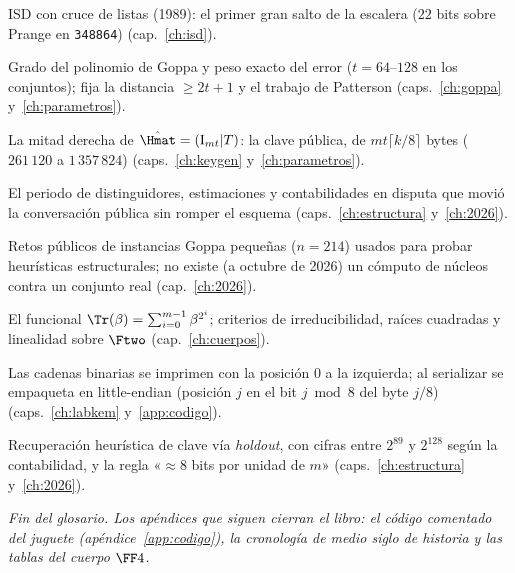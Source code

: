 \begin{description}[leftmargin=2.6em,style=nextline,itemsep=2.5pt,parsep=0pt]
  \item[\textbf{Stern (algoritmo de)}]
        ISD con cruce de listas (1989): el primer gran salto de la
        escalera ($22$ bits sobre Prange en \texttt{348864})
        (cap.~\ref{ch:isd}).

  \item[\textbf{$t$}]
        Grado del polinomio de Goppa y peso exacto del error
        ($t=64$--$128$ en los conjuntos); fija la distancia
        $\ge2t+1$ y el trabajo de Patterson
        (caps.~\ref{ch:goppa} y~\ref{ch:parametros}).

  \item[\textbf{$\Tmat$ (clave pública)}]
        La mitad derecha de $\hat{\Hmat}=(\mathrm{I}_{mt}|T)$: la
        clave pública, de $mt\lceil k/8\rceil$ bytes
        ($261\,120$ a $1\,357\,824$) (caps.~\ref{ch:keygen}
        y~\ref{ch:parametros}).

  \item[\textbf{Terremoto (2025--2026)}]
        El periodo de distinguidores, estimaciones y contabilidades
        en disputa que movió la conversación pública sin romper el
        esquema (caps.~\ref{ch:estructura} y~\ref{ch:2026}).

  \item[\textbf{TII}]
        Retos públicos de instancias Goppa pequeñas ($n=214$)
        usados para probar heurísticas estructurales; no existe
        (a octubre de 2026) un cómputo de núcleos contra un
        conjunto real (cap.~\ref{ch:2026}).

  \item[\textbf{Traza} ($\Tr$)]
        El funcional $\Tr(\beta)=\sum_{i=0}^{m-1}\beta^{2^i}$;
        criterios de irreducibilidad, raíces cuadradas y
        linealidad sobre $\Ftwo$ (cap.~\ref{ch:cuerpos}).

  \item[\textbf{Vectores (notación)}]
        Las cadenas binarias se imprimen con la posición $0$ a la
        izquierda; al serializar se empaqueta en little-endian
        (posición $j$ en el bit $j\bmod8$ del byte $j/8$)
        (caps.~\ref{ch:labkem} y~\ref{app:codigo}).

  \item[\textbf{Weis (ataques de 2026)}]
        Recuperación heurística de clave vía \emph{holdout},
        con cifras entre $2^{89}$ y $2^{128}$ según la
        contabilidad, y la regla «$\approx8$ bits por unidad de
        $m$» (caps.~\ref{ch:estructura} y~\ref{ch:2026}).

\end{description}

\medskip
\noindent\textit{Fin del glosario. Los apéndices que siguen cierran el
libro: el código comentado del juguete (apéndice~\ref{app:codigo}),
la cronología de medio siglo de historia y las tablas del cuerpo
$\FF4$.}
